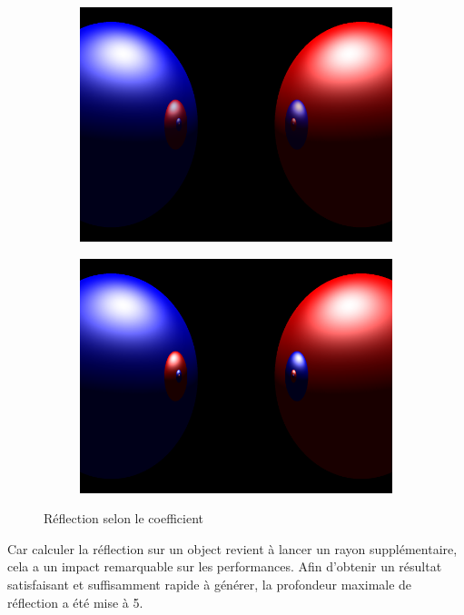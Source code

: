 \documentclass{article}
\begin{document}
\begin{figure}[hb]
  \begin{subfigure}{0.45\textwidth}
    \includegraphics[width=1\textwidth]{images/refl075.png}
  \end{subfigure}
  \begin{subfigure}{0.45\textwidth}
    \includegraphics[width=1\textwidth]{images/refl1.png}
  \end{subfigure}
  \caption{Réflection selon le coefficient\label{refl}}
\end{figure}

Car calculer la réflection sur un object revient à lancer un rayon
supplémentaire, cela a un impact remarquable sur les performances. Afin
d'obtenir un résultat satisfaisant et suffisamment rapide à générer, la
profondeur maximale de réflection a été mise à 5.
\end{document}
